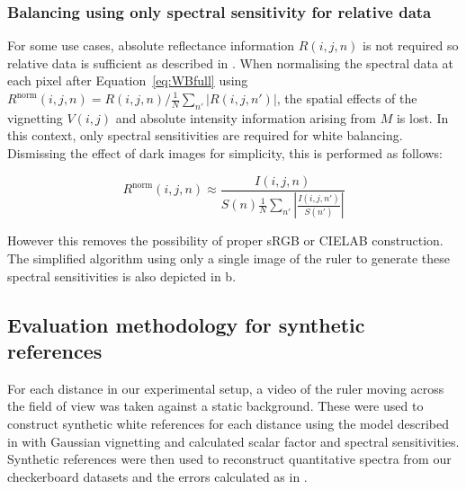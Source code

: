 % 
% 
%     
%    
%     
%     

% 
%    
%    
%    
%    
%     
%   

% 
%  
%     
%     
%    
% 
%    
%    
%  
%     
%     
%     

% 
%                       
% 
% 

%

\subsubsection{Balancing using only spectral sensitivity for relative data}
\label{algorithmrelative}
For some use cases, absolute reflectance information $R(i,j,n)$ is not required so relative data is sufficient as described in .
When normalising the spectral data at each pixel after Equation~\eqref{eq:WBfull} using \newline $R^{\textrm{norm}}(i,j,n) = R(i,j,n) / \frac{1}{N}\sum_{n'}|R(i,j,n')|$, the spatial effects of the vignetting $V(i,j)$ and absolute intensity information arising from $M$ is lost.
In this context, only spectral sensitivities are required for white balancing.
Dismissing the effect of dark images for simplicity, this is performed as follows:
\begin{linenomath*}
\begin{equation}
    R^{\textrm{norm}}(i,j,n) \approx \frac{I(i,j,n)}{S(n) \frac{1}{N}\sum_{n'}|\frac{I(i,j,n')}{S(n')}|} 
\end{equation}
\end{linenomath*}
However this removes the possibility of proper sRGB or CIELAB construction.
%
%
%
%
The simplified algorithm using only a single image of the ruler to generate these spectral sensitivities is also depicted in b. 

\subsection{Evaluation methodology for synthetic references}
\label{methodsynthetic}
For each distance in our experimental setup, a video of the ruler moving across the field of view was taken against a static background.
These were used to construct synthetic white references for each distance using the model described in  with Gaussian vignetting and calculated scalar factor and spectral sensitivities.
%
Synthetic references were then used to reconstruct quantitative spectra from our checkerboard datasets and the errors calculated as in 
%
.

